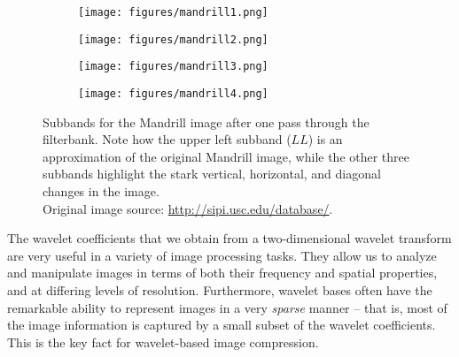 \begin{figure}
\centering
        \begin{subfigure}{0.4\textwidth}\centering
                    \texttt{[image: figures/mandrill1.png]}
       \end{subfigure}%
        \begin{subfigure}{0.4\textwidth}\centering
                    \texttt{[image: figures/mandrill2.png]}
       \end{subfigure}%
    \hfill
        \begin{subfigure}{0.4\textwidth}\centering
                    \texttt{[image: figures/mandrill3.png]}
       \end{subfigure}%
        \begin{subfigure}{0.4\textwidth}\centering
                    \texttt{[image: figures/mandrill4.png]}
       \end{subfigure}
    \caption{Subbands for the Mandrill image after one pass through the filterbank.
    Note how the upper left subband ($LL$) is an approximation of the original Mandrill image, while the other
    three subbands highlight the stark vertical, horizontal, and diagonal changes in the image.\\
    Original image source: \url{http://sipi.usc.edu/database/}.}
    \label{fig:dwt2D}
\end{figure}
The wavelet coefficients that we obtain from a two-dimensional wavelet transform are very useful in a variety of image processing tasks.
They allow us to analyze and manipulate images in terms of both their
frequency and spatial properties, and at differing levels of resolution.
Furthermore, wavelet bases often have the remarkable ability to represent
images in a very \textit{sparse} manner -- that is, most of the image
information is captured by a small subset of the wavelet coefficients.
This is the key fact for wavelet-based image compression.

